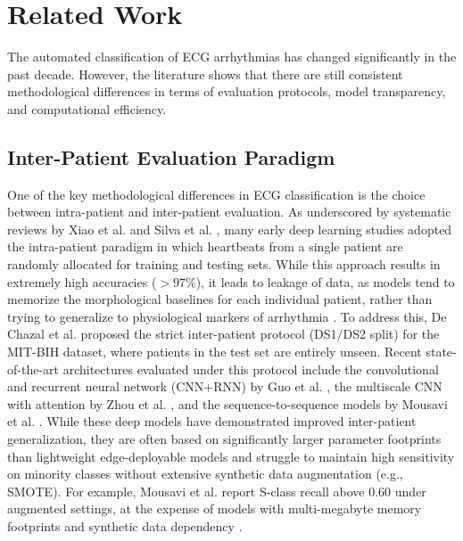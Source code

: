 \documentclass[journal,twoside,web]{ieeecolor}
\begin{document}
\section{Related Work}
\label{sec:related_work}

The automated classification of ECG arrhythmias has changed significantly in the past decade. However, the literature shows that there are still consistent methodological differences in terms of evaluation protocols, model transparency, and computational efficiency.

\subsection{Inter-Patient Evaluation Paradigm}
One of the key methodological differences in ECG classification is the choice between intra-patient and inter-patient evaluation. As underscored by systematic reviews by Xiao et al. \cite{xiao_deep_2023} and Silva et al. \cite{silva_systematic_2025}, many early deep learning studies adopted the intra-patient paradigm in which heartbeats from a single patient are randomly allocated for training and testing sets. While this approach results in extremely high accuracies ($> 97\%$), it leads to leakage of data, as models tend to memorize the morphological baselines for each individual patient, rather than trying to generalize to physiological markers of arrhythmia \cite{bahrami_investigation_2025}. To address this, De Chazal et al. \cite{chazal_automatic_2004} proposed the strict inter-patient protocol (DS1/DS2 split) for the MIT-BIH dataset, where patients in the test set are entirely unseen. Recent state-of-the-art architectures evaluated under this protocol include the convolutional and recurrent neural network (CNN+RNN) by Guo et al. \cite{guo_inter-patient_2019}, the multiscale CNN with attention by Zhou et al. \cite{zhou_inter-patient_2024}, and the sequence-to-sequence models by Mousavi et al. \cite{mousavi_inter-_2019}. While these deep models have demonstrated improved inter-patient generalization, they are often based on significantly larger parameter footprints than lightweight edge-deployable models and struggle to maintain high sensitivity on minority classes without extensive synthetic data augmentation (e.g., SMOTE). For example, Mousavi et al. \cite{mousavi_inter-_2019} report S-class recall above 0.60 under augmented settings, at the expense of models with multi-megabyte memory footprints and synthetic data dependency \cite{bahrami_investigation_2025, mousavi_inter-_2019}.
\end{document}
